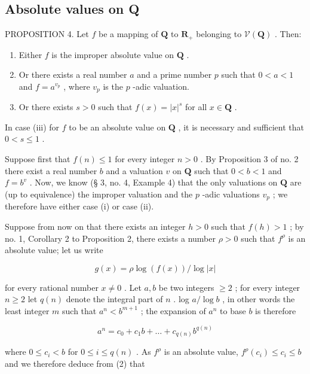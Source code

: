 \subsection{Absolute values on Q}

PROPOSITION 4. Let \(f\) be a mapping of \(\mathbf{Q}\) to \(\mathbf{R}_+\) belonging to \(\mathcal{V}(\mathbf{Q})\) . Then:

\begin{enumerate}
\def\labelenumi{(\roman{enumi})}
\item
  Either \(f\) is the improper absolute value on \(\mathbf{Q}\) .
\item
  Or there exists a real number \(a\) and a prime number \(p\) such that \(0 < a < 1\) and \(f = a^{v_p}\) , where \(v_p\) is the \(p\) -adic valuation.
\item
  Or there exists \(s > 0\) such that \(f(x) = |x|^s\) for all \(x \in \mathbf{Q}\) .
\end{enumerate}

In case (iii) for \(f\) to be an absolute value on \(\mathbf{Q}\) , it is necessary and sufficient that \(0 < s \leqslant 1\) .

Suppose first that \(f(n) \leqslant 1\) for every integer \(n > 0\) . By Proposition 3 of no. 2 there exist a real number \(b\) and a valuation \(v\) on \(\mathbf{Q}\) such that \(0 < b < 1\) and \(f = b^v\) . Now, we know (§ 3, no. 4, Example 4) that the only valuations on \(\mathbf{Q}\) are (up to equivalence) the improper valuation and the \(p\) -adic valuations \(v_p\) ; we therefore have either case (i) or case (ii).

Suppose from now on that there exists an integer \(h > 0\) such that \(f(h) > 1\) ; by no. 1, Corollary 2 to Proposition 2, there exists a number \(\rho > 0\) such that \(f^{\rho}\) is an absolute value; let us write

\[
g (x) = \rho \log (f (x)) / \log | x |
\]

for every rational number \(x \neq 0\) . Let \(a, b\) be two integers \(\geqslant 2\) ; for every integer \(n \geqslant 2\) let \(q(n)\) denote the integral part of \(n\) . log \(a / \log b\) , in other words the least integer \(m\) such that \(a^n < b^{m+1}\) ; the expansion of \(a^n\) to base \(b\) is therefore

\[
a ^ {n} = c _ {0} + c _ {1} b + \dots + c _ {q (n)} b ^ {q (n)}\tag{2}
\]

where \(0 \leqslant c_{i} < b\) for \(0 \leqslant i \leqslant q(n)\) . As \(f^{\rho}\) is an absolute value, \(f^{\rho}(c_{i}) \leqslant c_{i} \leqslant b\) and we therefore deduce from (2) that

